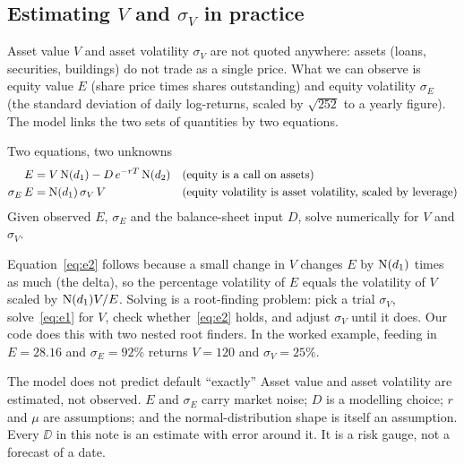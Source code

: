 \subsection{Estimating $V$ and $\sigma_V$ in practice}
\label{sec:estimate}
Asset value $V$ and asset volatility $\sigma_V$ are not quoted anywhere: assets (loans, securities, buildings) do not trade as a single price. What we can observe is equity value $E$ (share price times shares outstanding) and equity volatility $\sigma_E$ (the standard deviation of daily log-returns, scaled by $\sqrt{252}$ to a yearly figure). The model links the two sets of quantities by two equations.

\begin{keybox}{Two equations, two unknowns}
\begin{align}
E &= V\,\mathrm{N}(d_1)-D\,e^{-rT}\,\mathrm{N}(d_2) &&\text{(equity is a call on assets)}\label{eq:e1}\\
\sigma_E\,E &= \mathrm{N}(d_1)\,\sigma_V\,V &&\text{(equity volatility is asset volatility, scaled by leverage)}\label{eq:e2}
\end{align}
Given observed $E$, $\sigma_E$ and the balance-sheet input $D$, solve numerically for $V$ and $\sigma_V$.
\end{keybox}
Equation~\eqref{eq:e2} follows because a small change in $V$ changes $E$ by $\mathrm{N}(d_1)$ times as much (the delta), so the percentage volatility of $E$ equals the volatility of $V$ scaled by $\mathrm{N}(d_1)V/E$. Solving is a root-finding problem: pick a trial $\sigma_V$, solve~\eqref{eq:e1} for $V$, check whether~\eqref{eq:e2} holds, and adjust $\sigma_V$ until it does. Our code does this with two nested root finders. In the worked example, feeding in $E=28.16$ and $\sigma_E=92\%$ returns $V=120$ and $\sigma_V=25\%$.

\begin{warnbox}{The model does not predict default ``exactly''}
Asset value and asset volatility are estimated, not observed. $E$ and $\sigma_E$ carry market noise; $D$ is a modelling choice; $r$ and $\mu$ are assumptions; and the normal-distribution shape is itself an assumption. Every $\DD$ in this note is an estimate with error around it. It is a risk gauge, not a forecast of a date.
\end{warnbox}

